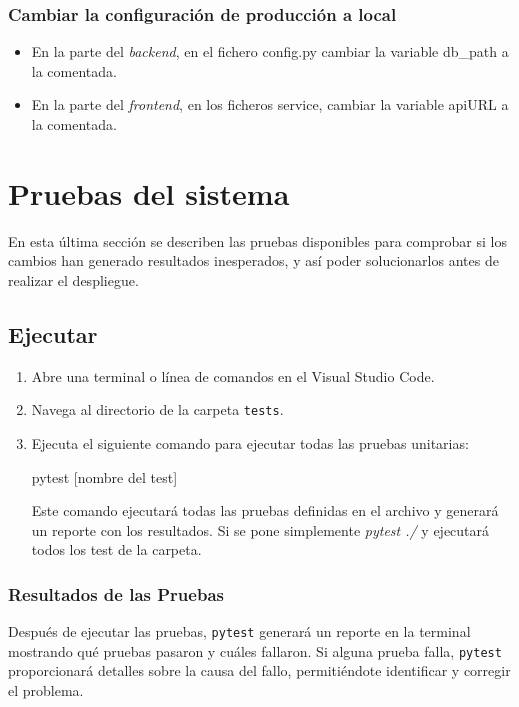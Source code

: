 \subsubsection{Cambiar la configuración de producción a local}
\begin{itemize}
    \item En la parte del \textit{backend}, en el fichero config.py cambiar la variable db\_path a la comentada.

    \item En la parte del \textit{frontend}, en los ficheros service, cambiar la variable apiURL a la comentada.
\end{itemize}

\section{Pruebas del sistema}
En esta última sección se describen las pruebas disponibles para comprobar si los cambios han generado resultados inesperados, y así poder solucionarlos antes de realizar el despliegue.

\subsection{Ejecutar}
\begin{enumerate}
    \item Abre una terminal o línea de comandos en el Visual Studio Code.
    \item Navega al directorio de la carpeta \texttt{tests}.
    \item Ejecuta el siguiente comando para ejecutar todas las pruebas unitarias:

    pytest [nombre del test]

    Este comando ejecutará todas las pruebas definidas en el archivo y generará un reporte con los resultados.
    Si se pone simplemente \textit{pytest ./} y ejecutará todos los test de la carpeta.

\end{enumerate}

\subsubsection{Resultados de las Pruebas}
Después de ejecutar las pruebas, \texttt{pytest} generará un reporte en la terminal mostrando qué pruebas pasaron y cuáles fallaron. Si alguna prueba falla, \texttt{pytest} proporcionará detalles sobre la causa del fallo, permitiéndote identificar y corregir el problema.

